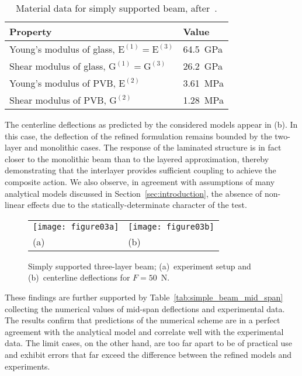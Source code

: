 \documentclass[11pt]{article}
\newcommand{\lay}[1]{^{(#1)}}
\newcommand{\E}[1]{\mathrm{E}\lay{#1}}\newcommand{\G}[1]{\mathrm{G}\lay{#1}}\newcommand{\A}[1]{A\lay{#1}}\newcommand{\I}[1]{I\lay{#1}}\newcommand{\As}[1]{A_\mathrm{s}\lay{#1}}
\newcommand{\Sref}[1]{Section~\ref{#1}}
\newcommand{\Tref}[1]{Table~\ref{#1}}
\begin{document}
\begin{table}[h]
\caption{Material data for simply supported beam,
after~\cite{Asik:2005:MMB}.}
\label{tab:simply_supported_data}
\centering
\begin{tabular}{ll}
\hline
Property & Value \\
\hline
Young's modulus of glass, $\E{1} = \E{3}$ & 64.5~GPa \\
Shear modulus of glass, $\G{1} = \G{3}$ & 26.2~GPa \\
Young's modulus of PVB, $\E{2}$ & 3.61~MPa \\
Shear modulus of PVB, $\G{2}$ & 1.28~MPa \\  
\hline
\end{tabular}
\end{table}

The centerline deflections as predicted by the considered models appear in
(b). In this case, the deflection of the refined
formulation remains bounded by the two-layer and monolithic cases. The
response of the laminated structure is in fact closer to the monolithic beam than to the
layered approximation, thereby demonstrating that the interlayer
provides sufficient coupling to achieve the composite action. We also observe,
in agreement with assumptions of many analytical models discussed in
\Sref{sec:introduction}, the absence of non-linear effects due to
the statically-determinate character of the test.

\begin{figure}[h]
\begin{tabular}{ll}
\texttt{[image: figure03a]} & 
\texttt{[image: figure03b]} 
\\[-5mm]
(a) & (b)
\end{tabular}
\caption{Simply supported three-layer beam; (a)~experiment setup and
(b)~centerline deflections for $F = 50$~N.}
\label{fig:simply_supported}
\end{figure}

These findings are further supported by \Tref{tab:simple_beam_mid_span}
collecting the numerical values of mid-span deflections and experimental data.
The results confirm that predictions of the numerical scheme are in a perfect
agreement with the analytical model and correlate well with the experimental
data. The limit cases, on the other hand, are too far apart to be of practical
use and exhibit errors that far exceed the difference between the refined models and
experiments.
\end{document}
